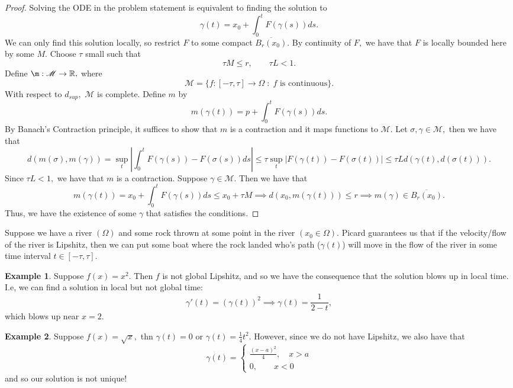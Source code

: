 \documentclass[10pt, oneside]{article}
\newcommand{\bbR}{\mathbb{R}}
\theoremstyle{definition}
\newtheorem{exmp}{Example}[section]
\begin{document}
\begin{proof}
    Solving the ODE in the problem statement is equivalent to finding the solution to 
    \[\gamma(t) = x_0 + \int_0^t F(\gamma(s))ds.\]
    We can only find this solution locally, so restrict $F$ to some compact $\overline{B_r(x_0)}.$ By continuity of $F,$ we have that $F$ is locally bounded here by some $M.$ Choose $\tau$ small such that 
    \[\tau M \leq r, \qquad \tau L <1.\]
    Define $\m: \mathcal{M}\to \bbR,$ where 
    \[\mathcal{M} = \{f: [-\tau, \tau] \to \Omega\; : \; \text{$f$ is continuous}\}.\] With respect to $d_{sup},$ $\mathcal{M}$ is complete. Define $m$ by 
    \[m(\gamma(t)) = p + \int_0^t F(\gamma(s))ds.\] By Banach's Contraction principle, it suffices to show that $m$ is a contraction and it maps functions to $\mathcal{M}$. Let $\sigma, \gamma \in \mathcal{M},$ then we have that 
    \[d(m(\sigma), m(\gamma)) = \sup_{t}\left|\int_0^t F(\gamma(s)) - F(\sigma(s))ds\right|\leq \tau \sup_{t}|F(\gamma(t)) - F(\sigma(t))|\leq \tau Ld(\gamma(t), d(\sigma(t))).\] Since $\tau L <1,$ we have that $m$ is a contraction. Suppose $\gamma \in \mathcal{M}.$ Then we have that 
    \[m(\gamma(t)) = x_0 + \int_0^t F(\gamma(s))ds\leq x_0 + \tau M \implies d(x_0, m(\gamma(t))) \leq r \implies m(\gamma)\in \overline{B_r(x_0)}.\] Thus, we have the existence of some $\gamma$ that satisfies the conditions.
\end{proof}
Suppose we have a river $(\Omega)$ and some rock thrown at some point in the river $(x_0\in \Omega).$ Picard guarantees us that if the velocity/flow of the river is Lipshitz, then we can put some boat where the rock landed who's path ($\gamma(t)$) will move in the flow of the river in some time interval $t\in [-\tau, \tau]$.  
\begin{exmp}
    Suppose $f(x) = x^2.$ Then $f$ is not global Lipshitz, and so we have the consequence that the solution blows up in local time. I.e, we can find a solution in local but not global time:
    \[\gamma'(t) = (\gamma(t))^2 \implies \gamma(t) = \frac{1}{2-t},\] which blows up near $x = 2.$ 
\end{exmp}

\begin{exmp}
Suppose $f(x) = \sqrt{x},$ thn $\gamma(t) = 0$ or $\gamma(t) = \frac{1}{4}t^2.$ However, since we do not have Lipshitz, we also have that 
\[\gamma(t) = \begin{cases}
    \frac{(x-a)^2}{4}, \quad x >a\\
    0, \qquad x<0
\end{cases}\]
and so our solution is not unique!
\end{exmp}
\end{document}
